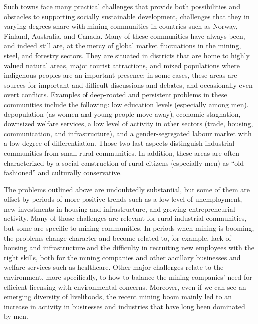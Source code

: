 \documentclass[
  12pt,
]{scrbook}
\begin{document}
Such towns face many practical challenges that provide both possibilities and obstacles to supporting socially sustainable development, challenges that they in varying degrees share with mining communities in countries such as Norway, Finland, Australia, and Canada. Many of these communities have always been, and indeed still are, at the mercy of global market fluctuations in the mining, steel, and forestry sectors. They are situated in districts that are home to highly valued natural areas, major tourist attractions, and mixed populations where indigenous peoples are an important presence; in some cases, these areas are sources for important and difficult discussions and debates, and occasionally even overt conflicts. Examples of deep-rooted and persistent problems in these communities include the following: low education levels (especially among men), depopulation (as women and young people move away), economic stagnation, downsized welfare services, a low level of activity in other sectors (trade, housing, communication, and infrastructure), and a gender-segregated labour market with a low degree of differentiation. Those two last aspects distinguish industrial communities from small rural communities. In addition, these areas are often characterized by a social construction of rural citizens (especially men) as ``old fashioned'' and culturally conservative.

The problems outlined above are undoubtedly substantial, but some of them are offset by periods of more positive trends such as a low level of unemployment, new investments in housing and infrastructure, and growing entrepreneurial activity. Many of those challenges are relevant for rural industrial communities, but some are specific to mining communities. In periods when mining is booming, the problems change character and become related to, for example, lack of housing and infrastructure and the difficulty in recruiting new employees with the right skills, both for the mining companies and other ancillary businesses and welfare services such as healthcare. Other major challenges relate to the environment, more specifically, to how to balance the mining companies' need for efficient licensing with environmental concerns. Moreover, even if we can see an emerging diversity of livelihoods, the recent mining boom mainly led to an increase in activity in businesses and industries that have long been dominated by men.
\end{document}
